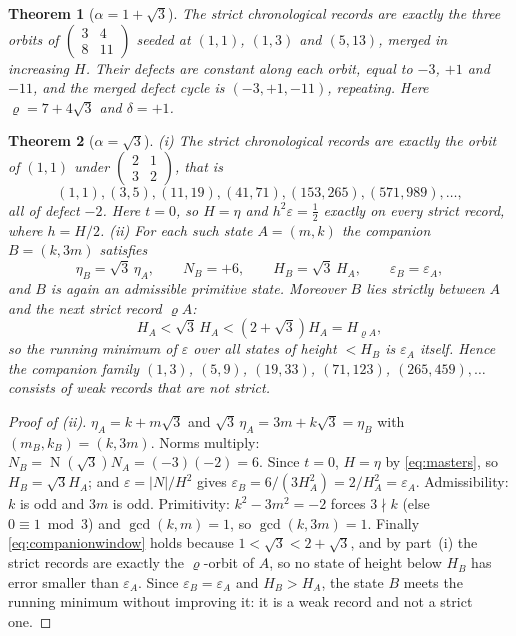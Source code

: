 \documentclass[11pt]{article}
\newtheorem{theorem}{Theorem}[section]
\theoremstyle{definition}
\theoremstyle{remark}
\newcommand{\pr}{\varrho}
\DeclareMathOperator{\Nm}{N}
\newcommand{\mat}[4]{\left(\begin{smallmatrix}#1&#2\\#3&#4\end{smallmatrix}\right)}
\begin{document}
\begin{theorem}[$\alpha=1+\sqrt3$]\label{thm:B}
The strict chronological records are exactly the three orbits of
$\mat{3}{4}{8}{11}$ seeded at $(1,1)$, $(1,3)$ and $(5,13)$, merged in increasing $H$.
Their defects are constant along each orbit, equal to $-3$, $+1$ and $-11$, and the merged
defect cycle is $(-3,+1,-11)$, repeating. Here $\pr=7+4\sqrt3$ and $\delta=+1$.
\end{theorem}

\begin{theorem}[$\alpha=\sqrt3$]\label{thm:C}
\emph{(i)} The strict chronological records are exactly the orbit of $(1,1)$ under
$\mat{2}{1}{3}{2}$, that is
\[
(1,1),(3,5),(11,19),(41,71),(153,265),(571,989),\dots,
\]
all of defect $-2$. Here $t=0$, so $H=\eta$ and $h^2\varepsilon=\tfrac12$ exactly on every
strict record, where $h=H/2$.
\emph{(ii)} For each such state $A=(m,k)$ the companion $B=(k,3m)$ satisfies
\[
\eta_B=\sqrt3\,\eta_A,\qquad N_B=+6,\qquad H_B=\sqrt3\,H_A,\qquad \varepsilon_B=\varepsilon_A ,
\]
and $B$ is again an admissible primitive state. Moreover $B$ lies strictly between $A$ and the
next strict record $\pr A$:
\begin{equation}\label{eq:companionwindow}
H_A<\sqrt3\,H_A<(2+\sqrt3)H_A=H_{\pr A},
\end{equation}
so the running minimum of $\varepsilon$ over all states of height $<H_B$ is $\varepsilon_A$
itself. Hence the companion family $(1,3)$, $(5,9)$, $(19,33)$, $(71,123)$,
$(265,459),\dots$ consists of \emph{weak} records that are not strict.
\end{theorem}

\begin{proof}[Proof of (ii)]
$\eta_A=k+m\sqrt3$ and $\sqrt3\,\eta_A=3m+k\sqrt3=\eta_B$ with $(m_B,k_B)=(k,3m)$. Norms
multiply: $N_B=\Nm(\sqrt3)N_A=(-3)(-2)=6$. Since $t=0$, $H=\eta$ by \eqref{eq:masters}, so
$H_B=\sqrt3H_A$; and $\varepsilon=|N|/H^2$ gives
$\varepsilon_B=6/(3H_A^2)=2/H_A^2=\varepsilon_A$. Admissibility: $k$ is odd and $3m$ is odd.
Primitivity: $k^2-3m^2=-2$ forces $3\nmid k$ (else $0\equiv1\bmod3$) and $\gcd(k,m)=1$, so
$\gcd(k,3m)=1$. Finally \eqref{eq:companionwindow} holds because $1<\sqrt3<2+\sqrt3$, and by part~(i) the
strict records are exactly the $\pr$-orbit of $A$, so no state of height below $H_B$ has error
smaller than $\varepsilon_A$. Since $\varepsilon_B=\varepsilon_A$ and $H_B>H_A$, the state $B$
meets the running minimum without improving it: it is a weak record and not a strict one.
\end{proof}
\end{document}
